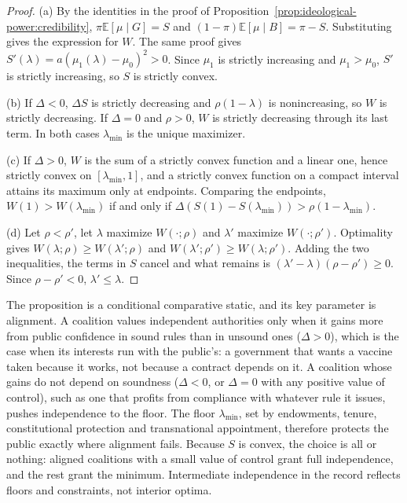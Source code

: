 \documentclass[11pt,letterpaper]{article}
\theoremstyle{definition}
\theoremstyle{remark}
\newcommand{\E}{\mathbb{E}}
\begin{document}
\begin{proof}
(a) By the identities in the proof of Proposition~\ref{prop:ideological-power:credibility}, $\pi\E[\mu\mid G]=S$ and $(1-\pi)\E[\mu\mid B]=\pi-S$. Substituting gives the expression for $W$. The same proof gives $S'(\lambda)=a(\mu_1(\lambda)-\mu_0)^2>0$. Since $\mu_1$ is strictly increasing and $\mu_1>\mu_0$, $S'$ is strictly increasing, so $S$ is strictly convex.

(b) If $\Delta<0$, $\Delta S$ is strictly decreasing and $\rho(1-\lambda)$ is nonincreasing, so $W$ is strictly decreasing. If $\Delta=0$ and $\rho>0$, $W$ is strictly decreasing through its last term. In both cases $\lambda_{\min}$ is the unique maximizer.

(c) If $\Delta>0$, $W$ is the sum of a strictly convex function and a linear one, hence strictly convex on $[\lambda_{\min},1]$, and a strictly convex function on a compact interval attains its maximum only at endpoints. Comparing the endpoints, $W(1)>W(\lambda_{\min})$ if and only if $\Delta(S(1)-S(\lambda_{\min}))>\rho(1-\lambda_{\min})$.

(d) Let $\rho<\rho'$, let $\lambda$ maximize $W(\cdot;\rho)$ and $\lambda'$ maximize $W(\cdot;\rho')$. Optimality gives $W(\lambda;\rho)\geq W(\lambda';\rho)$ and $W(\lambda';\rho')\geq W(\lambda;\rho')$. Adding the two inequalities, the terms in $S$ cancel and what remains is $(\lambda'-\lambda)(\rho-\rho')\geq0$. Since $\rho-\rho'<0$, $\lambda'\leq\lambda$.
\end{proof}

The proposition is a conditional comparative static, and its key parameter is alignment. A coalition values independent authorities only when it gains more from public confidence in sound rules than in unsound ones ($\Delta>0$), which is the case when its interests run with the public's: a government that wants a vaccine taken because it works, not because a contract depends on it. A coalition whose gains do not depend on soundness ($\Delta<0$, or $\Delta=0$ with any positive value of control), such as one that profits from compliance with whatever rule it issues, pushes independence to the floor. The floor $\lambda_{\min}$, set by endowments, tenure, constitutional protection and transnational appointment, therefore protects the public exactly where alignment fails. Because $S$ is convex, the choice is all or nothing: aligned coalitions with a small value of control grant full independence, and the rest grant the minimum. Intermediate independence in the record reflects floors and constraints, not interior optima.
\end{document}
